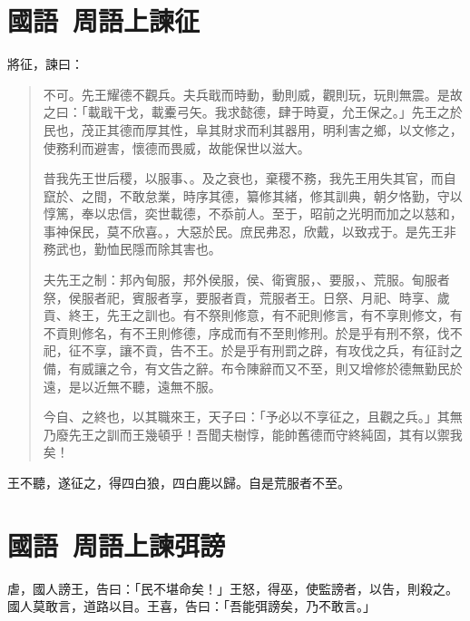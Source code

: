 \section[祭公諫征犬戎\quad{\small 國語 周語上}]{{\normalsize 國語\ 周語上}\quad {}諫征}
將征，諫曰：

\begin{quotation}
不可。先王耀德不觀兵。夫兵戢而時動，動則威，觀則玩，玩則無震。是故之曰：「載戢干戈，載櫜弓矢。我求懿德，肆于時夏，允王保之。」先王之於民也，{茂}正其德而厚其性，阜其財求而利其器用，明利害之鄉，以文修之，使務利而避害，懷德而畏威，故能保世以滋大。

昔我先王世后稷，以服事、。及之衰也，棄稷不務，我先王用失其官，而自竄於、之間，不敢怠業，時序其德，纂修其緒，修其訓典，朝夕恪勤，守以{惇}篤，奉以忠信，奕世載德，不忝前人。至于，昭前之光明而加之以慈和，事神保民，莫不欣喜。，大惡於民。庶民弗忍，欣戴，以致戎于。是先王非務武也，勤恤民隱而除其害也。

夫先王之制：邦內甸服，邦外侯服，侯、衛賓服，、要服，、荒服。甸服者祭，侯服者祀，賓服者享，要服者貢，荒服者王。日祭、月祀、時享、歲貢、終王，先王之訓也。有不祭則修意，有不祀則修言，有不享則修文，有不貢則修名，有不王則修德，序成而有不至則修刑。於是乎有刑不祭，伐不祀，征不享，讓不貢，告不王。於是乎有刑罰之辟，有攻伐之兵，有征討之備，有威讓之令，有文告之辭。布令陳辭而又不至，則又增修於德無勤民於遠，是以近無不聽，遠無不服。

今自、之終也，以其職來王，天子曰：「予必以不享征之，且觀之兵。」其無乃廢先王之訓而王幾頓乎！吾聞夫樹惇，能帥舊德而守終純固，其有以禦我矣！
\end{quotation}

王不聽，遂征之，得四白狼，四白鹿以歸。自是荒服者不至。

\section[召公諫厲王弭謗\quad{\small 國語 周語上}]{{\normalsize 國語\ 周語上}\quad {}諫弭謗}
虐，國人謗王，告曰：「民不堪命矣！」王怒，得巫，使監謗者，以告，則殺之。國人莫敢言，道路以目。王喜，告曰：「吾能弭謗矣，乃不敢言。」

